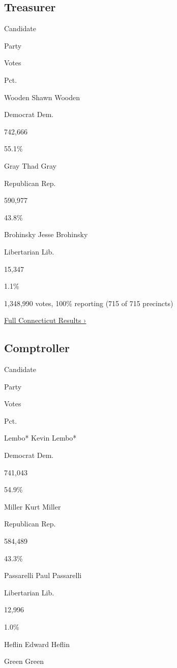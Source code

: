 \hypertarget{treasurer}{%
\subsection{Treasurer}\label{treasurer}}

Candidate

Party

Votes

Pct.

 Wooden Shawn Wooden

Democrat Dem.

742,666

55.1\%

 Gray Thad Gray

Republican Rep.

590,977

43.8\%

 Brohinsky Jesse Brohinsky

Libertarian Lib.

15,347

1.1\%

1,348,990 votes, 100\% reporting (715 of 715 precincts)

\href{https://www.nytimes3xbfgragh.onion/interactive/2018/11/06/us/elections/results-connecticut-elections.html}{Full
Connecticut Results ›}

\hypertarget{comptroller}{%
\subsection{Comptroller}\label{comptroller}}

Candidate

Party

Votes

Pct.

 Lembo* Kevin Lembo*

Democrat Dem.

741,043

54.9\%

 Miller Kurt Miller

Republican Rep.

584,489

43.3\%

 Passarelli Paul Passarelli

Libertarian Lib.

12,996

1.0\%

 Heflin Edward Heflin

Green Green

